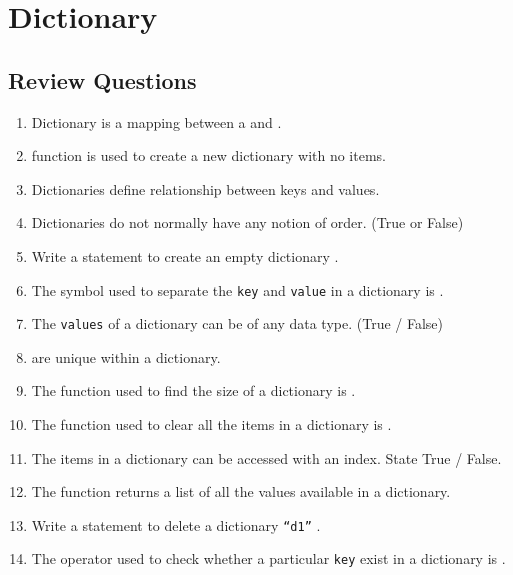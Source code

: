 \documentclass[11pt,a4paper]{article}
\begin{document}
\section*{Dictionary}
\subsection*{Review Questions}
\begin{enumerate}\itemsep10pt
    \item Dictionary is a mapping between a \underline{\hspace{3cm}} and \underline{\hspace{3cm}}.
    \item \underline{\hspace{3cm}} function is used to create a new dictionary with no items.     
    \item Dictionaries define \underline{\hspace{3cm}} relationship between keys and values.
    \item Dictionaries do not normally have any notion of order. (True or False)
    \item Write a statement to create an empty dictionary \underline{\hspace{3cm}}. 
    \item The symbol used to separate the \texttt{key} and \texttt{value} in a dictionary is \underline{\hspace{3cm}}.    
    \item The \texttt{values} of a dictionary can be of any data type. (True / False)
    \item \underline{\hspace{3cm}} are unique within a dictionary.
    \item The function used to find the size of a dictionary is \underline{\hspace{3cm}}.
    \item The function used to clear all the items in a dictionary is \underline{\hspace{3cm}}.
    \item The items in a dictionary can be accessed with an index. State True / False.
    \item The \underline{\hspace{3cm}} function returns a list of all the values available in a dictionary.
    \item Write a statement to delete a dictionary \texttt{``d1''} \underline{\hspace{3cm}}.
    \item The operator used to check whether a  particular \texttt{key} exist in a dictionary is \underline{\hspace{3cm}}.
\end{enumerate}
\end{document}
